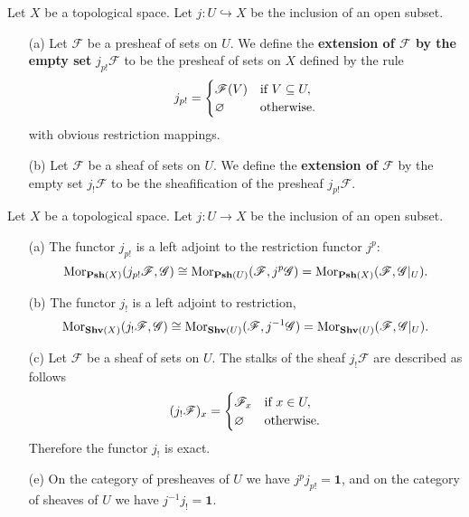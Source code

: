 \begin{definition}
Let $X$ be a topological space. Let $j:U\hookrightarrow X$ be the inclusion
of an open subset.
\begin{itemize}
\item[(a)] Let $\mathscr{F}$ be a presheaf of sets on $U$. We define the \textbf{extension of $\mathscr{F}$ by the empty set} $j_{p!}\mathscr{F}$ to be the presheaf of sets on $X$ defined by the rule
\[j_{p!}=\begin{cases}
\mathscr{F}(V)&\text{if }V\subseteq U,\\
\varnothing&\text{otherwise}.
\end{cases}\]
with obvious restriction mappings.
\item[(b)] Let $\mathscr{F}$ be a sheaf of sets on $U$. We define the \textbf{extension of $\mathscr{F}$} by the empty set $j_!\mathscr{F}$ to be the sheafification of the presheaf $j_{p!}\mathscr{F}$.
\end{itemize}
\end{definition}
\begin{proposition}\label{sheaf open extension functor prop}
Let $X$ be a topological space. Let $j:U\to X$ be the inclusion of an open subset. 
\begin{itemize}
\item[(a)] The functor $j_{p!}$ is a left adjoint to the restriction functor $j^p$:
\[\mathrm{Mor}_{\mathbf{Psh}(X)}(j_{p!}\mathscr{F},\mathscr{G})\cong\mathrm{Mor}_{\mathbf{Psh}(U)}(\mathscr{F},j^p\mathscr{G})=\mathrm{Mor}_{\mathbf{Psh}(X)}(\mathscr{F},\mathscr{G}|_U).\]
\item[(b)] The functor $j_!$ is a left adjoint to restriction,
\[\mathrm{Mor}_{\mathbf{Shv}(X)}(j_{!}\mathscr{F},\mathscr{G})\cong\mathrm{Mor}_{\mathbf{Shv}(U)}(\mathscr{F},j^{-1}\mathscr{G})=\mathrm{Mor}_{\mathbf{Shv}(U)}(\mathscr{F},\mathscr{G}|_U).\]
\item[(c)] Let $\mathscr{F}$ be a sheaf of sets on $U$. The stalks of the sheaf $j_!\mathscr{F}$ are described as follows
\[(j_!\mathscr{F})_x=\begin{cases}
\mathscr{F}_x&\text{if }x\in U,\\
\varnothing&\text{otherwise}.
\end{cases}\]
Therefore the functor $j_!$ is exact.
\item[(e)] On the category of presheaves of $U$ we have $j^pj_{p!}=\mathbf{1}$, and on the category of sheaves of $U$ we have $j^{-1}j_!=\mathbf{1}$.
\end{itemize}
\end{proposition}
